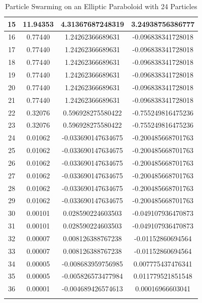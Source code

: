 \documentclass[oneside,12pt,openany]{book}
\begin{document}
\begin{longtable}[c]{|c|c|c|c|}
        15 & 11.94353 & 4.31367687248319 & 3.24938756386777 \\ \hline
        16 & 0.77440 & 1.24262366689631 & -0.096838341728018 \\ \hline
        17 & 0.77440 & 1.24262366689631 & -0.096838341728018 \\ \hline
        18 & 0.77440 & 1.24262366689631 & -0.096838341728018 \\ \hline
        19 & 0.77440 & 1.24262366689631 & -0.096838341728018 \\ \hline
        20 & 0.77440 & 1.24262366689631 & -0.096838341728018 \\ \hline
        21 & 0.77440 & 1.24262366689631 & -0.096838341728018 \\ \hline
        22 & 0.32076 & 0.596928275580422 & -0.755249816475236 \\ \hline
        23 & 0.32076 & 0.596928275580422 & -0.755249816475236 \\ \hline
        24 & 0.01062 & -0.033690147634675 & -0.200485668701763 \\ \hline
        25 & 0.01062 & -0.033690147634675 & -0.200485668701763 \\ \hline
        26 & 0.01062 & -0.033690147634675 & -0.200485668701763 \\ \hline
        27 & 0.01062 & -0.033690147634675 & -0.200485668701763 \\ \hline
        28 & 0.01062 & -0.033690147634675 & -0.200485668701763 \\ \hline
        29 & 0.01062 & -0.033690147634675 & -0.200485668701763 \\ \hline
        30 & 0.00101 & 0.028590224603503 & -0.049107936470873 \\ \hline
        31 & 0.00101 & 0.028590224603503 & -0.049107936470873 \\ \hline
        32 & 0.00007 & 0.008126388767238 & -0.01152860694564 \\ \hline
        33 & 0.00007 & 0.008126388767238 & -0.01152860694564 \\ \hline
        34 & 0.00005 & -0.008683959756985 & 0.007775437476341 \\ \hline
        35 & 0.00005 & -0.005826573477984 & 0.011779521851548 \\ \hline
        36 & 0.00001 & -0.004689426574613 & 0.00016966603041 \\ \hline
        \caption{Particle Swarming on an Elliptic Paraboloid with 24 Particles}
        \label{tab:swarmParabola}\\
    \end{longtable}
\end{document}
